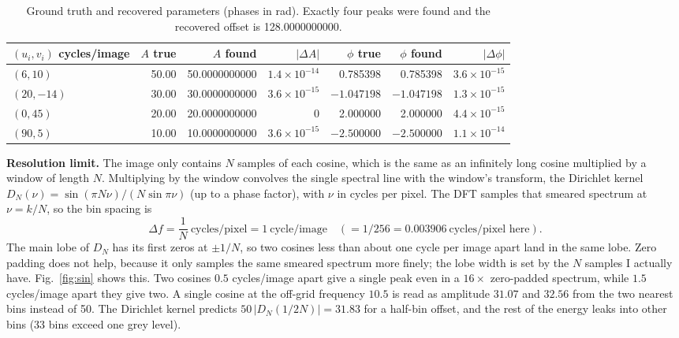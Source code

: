 \begin{table}[H]
\centering
\begin{tabular}{lrrrrrr}
\toprule
$(u_i,v_i)$ cycles/image & $A$ true & $A$ found & $|\Delta A|$ & $\phi$ true & $\phi$ found & $|\Delta\phi|$\\
\midrule
$(6,10)$ & 50.00 & 50.0000000000 & $1.4\times10^{-14}$ & 0.785398 & 0.785398 & $3.6\times10^{-15}$\\
$(20,-14)$ & 30.00 & 30.0000000000 & $3.6\times10^{-15}$ & $-1.047198$ & $-1.047198$ & $1.3\times10^{-15}$\\
$(0,45)$ & 20.00 & 20.0000000000 & 0 & 2.000000 & 2.000000 & $4.4\times10^{-15}$\\
$(90,5)$ & 10.00 & 10.0000000000 & $3.6\times10^{-15}$ & $-2.500000$ & $-2.500000$ & $1.1\times10^{-14}$\\
\bottomrule
\end{tabular}
\caption{Ground truth and recovered parameters (phases in rad). Exactly four
peaks were found and the recovered offset is 128.0000000000.}
\label{tab:sin}
\end{table}

\textbf{Resolution limit.} The image only contains $N$ samples of each cosine,
which is the same as an infinitely long cosine multiplied by a window of length
$N$. Multiplying by the window convolves the single spectral line with the
window's transform, the Dirichlet kernel
$D_N(\nu)=\sin(\pi N\nu)/(N\sin\pi\nu)$ (up to a phase factor), with $\nu$ in
cycles per pixel. The DFT samples that smeared spectrum at $\nu=k/N$, so the bin
spacing is
\begin{equation}
\Delta f=\frac1N\ \text{cycles/pixel}=1\ \text{cycle/image}\quad(=1/256=0.003906\ \text{cycles/pixel here}).
\end{equation}
The main lobe of $D_N$ has its first zeros at $\pm1/N$, so two cosines less than
about one cycle per image apart land in the same lobe. Zero padding does not
help, because it only samples the same smeared spectrum more finely; the lobe
width is set by the $N$ samples I actually have. Fig.~\ref{fig:sin} shows this.
Two cosines $0.5$ cycles/image apart give a single peak even in a $16\times$
zero-padded spectrum, while $1.5$ cycles/image apart they give two. A single
cosine at the off-grid frequency $10.5$ is read as amplitude $31.07$ and $32.56$
from the two nearest bins instead of 50. The Dirichlet kernel predicts
$50\,|D_N(1/2N)|=31.83$ for a half-bin offset, and the rest of the energy leaks
into other bins (33 bins exceed one grey level).

